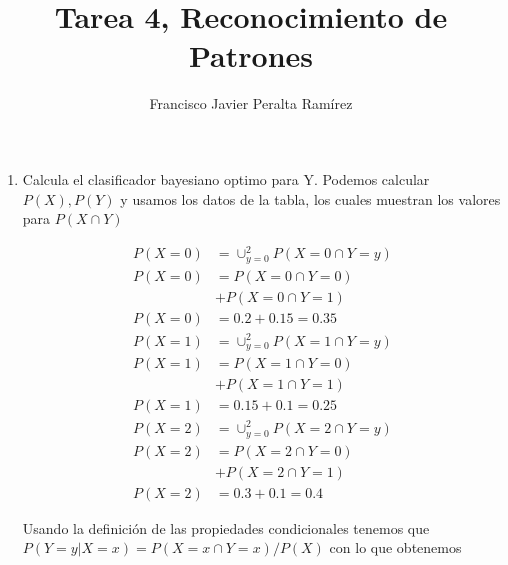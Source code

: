 \documentclass{article}
\title {Tarea 4, Reconocimiento de Patrones}
\author {Francisco Javier Peralta Ramírez}
\date{\vspace{-2ex}}
\begin{document}
\vspace{-2ex}
\maketitle
\begin{enumerate}

\item Calcula el clasificador bayesiano optimo para Y. Podemos calcular $P(X), P(Y)$ y usamos los datos de la tabla, los cuales muestran los valores para $P(X \cap Y)$

\begin{multicols}{3}
\small
  \begin{align*}
    P(X = 0) &= \cup_{y = 0}^{2} P( X = 0 \cap Y = y)\\
    P(X = 0) &= P(X = 0 \cap Y = 0) \\&+ P(X = 0 \cap Y = 1)\\
    P(X = 0) &= 0.2 + 0.15 = 0.35
  \end{align*}\break
  \begin{align*}
    P(X = 1) &= \cup_{y = 0}^{2} P( X = 1 \cap Y = y)\\
    P(X = 1) &= P(X = 1 \cap Y = 0) \\&+ P(X = 1 \cap Y = 1)\\
    P(X = 1) &= 0.15 + 0.1 = 0.25
  \end{align*}\break
  \begin{align*}
    P(X = 2) &= \cup_{y = 0}^{2} P( X = 2 \cap Y = y)\\
    P(X = 2) &= P(X = 2 \cap Y = 0) \\&+ P(X = 2 \cap Y = 1)\\
    P(X = 2) &= 0.3 + 0.1 = 0.4
  \end{align*}
\end{multicols}

Usando la definición de las propiedades condicionales tenemos que $P(Y = y | X = x) = P(X = x \cap Y = x) / P(X)$ con lo que obtenemos


\end{enumerate}
\end{document}
